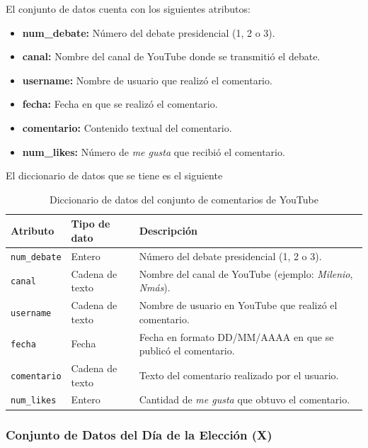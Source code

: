 \documentclass[10pt, a4paper]{article}
\begin{document}
	El conjunto de datos cuenta con los siguientes atributos:
	
	\begin{itemize}
		\item \textbf{num\_debate:} Número del debate presidencial (1, 2 o 3).
		\item \textbf{canal:} Nombre del canal de YouTube donde se transmitió el debate.
		\item \textbf{username:} Nombre de usuario que realizó el comentario.
		\item \textbf{fecha:} Fecha en que se realizó el comentario.
		\item \textbf{comentario:} Contenido textual del comentario.
		\item \textbf{num\_likes:} Número de \textit{me gusta} que recibió el comentario.
	\end{itemize}
	
	El diccionario de datos que se tiene es el siguiente
	
	\begin{table}[h]
		\centering
		\begin{tabular}{llp{9cm}}
			\hline
			\textbf{Atributo} & \textbf{Tipo de dato} & \textbf{Descripción} \\
			\hline
			\texttt{num\_debate} & Entero & Número del debate presidencial (1, 2 o 3). \\
			\texttt{canal} & Cadena de texto & Nombre del canal de YouTube (ejemplo: \textit{Milenio}, \textit{Nmás}). \\
			\texttt{username} & Cadena de texto & Nombre de usuario en YouTube que realizó el comentario. \\
			\texttt{fecha} & Fecha & Fecha en formato DD/MM/AAAA en que se publicó el comentario. \\
			\texttt{comentario} & Cadena de texto & Texto del comentario realizado por el usuario. \\
			\texttt{num\_likes} & Entero & Cantidad de \textit{me gusta} que obtuvo el comentario. \\
			\hline
		\end{tabular}
		\caption{Diccionario de datos del conjunto de comentarios de YouTube}
	\end{table}
	
	\subsubsection{Conjunto de Datos del Día de la Elección (X)}
	
\end{document}
